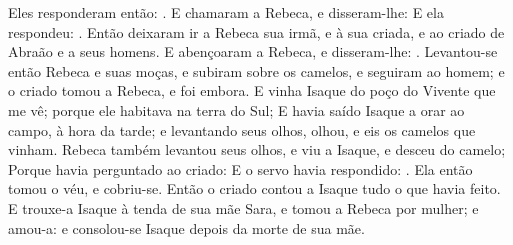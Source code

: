 {{Eles responderam então: .
E chamaram a Rebeca, e disseram-lhe:  E ela respondeu: .
Então deixaram ir a Rebeca sua irmã, e à sua criada, e ao criado de Abraão e a seus homens.
E abençoaram a Rebeca, e disseram-lhe: .
Levantou-se então Rebeca e suas moças, e subiram sobre os camelos, e seguiram ao homem; e o criado tomou a Rebeca, e foi embora.
E vinha Isaque do poço do Vivente que me vê; porque ele habitava na terra do Sul;
E havia saído Isaque a orar ao campo, à hora da tarde; e levantando seus olhos, olhou, e eis os camelos que vinham.
Rebeca também levantou seus olhos, e viu a Isaque, e desceu do camelo;
Porque havia perguntado ao criado:  E o servo havia respondido: . Ela então tomou o véu, e cobriu-se.
Então o criado contou a Isaque tudo o que havia feito.
E trouxe-a Isaque à tenda de sua mãe Sara, e tomou a Rebeca por mulher; e amou-a: e consolou-se Isaque depois da morte de sua mãe.

\par}

}
